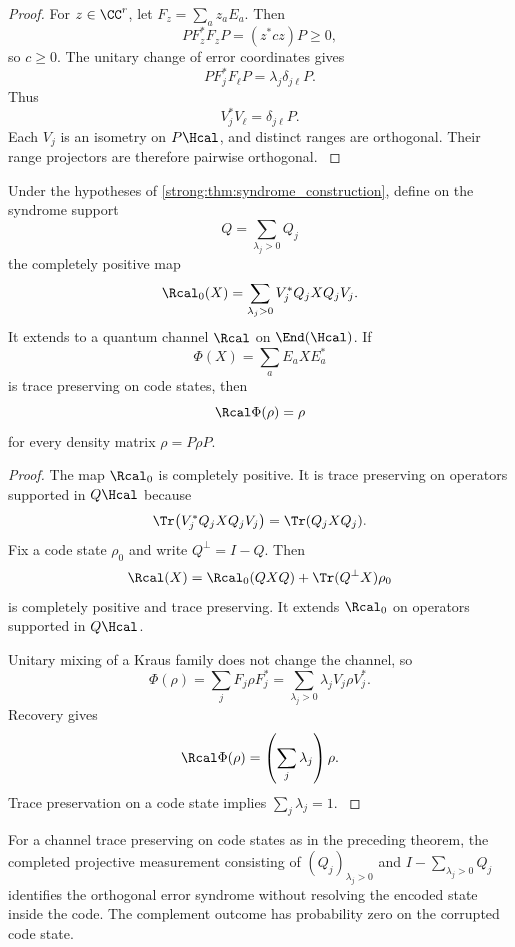 \begin{proof}\label{strong:proof:040}
For \(z\in\CC^r\), let \(F_z=\sum_az_aE_a\). Then
\[
PF_z^*F_zP=(z^*cz)P\geq0,
\]
so \(c\geq0\). The unitary change of error coordinates gives
\[
PF_j^*F_\ell P
=
\lambda_j\delta_{j\ell}P.
\]
Thus
\[
V_j^*V_\ell=\delta_{j\ell}P.
\]
Each \(V_j\) is an isometry on \(P\Hcal\), and distinct ranges are orthogonal. Their range projectors are therefore pairwise orthogonal.
\label{strong:proof:040:end}\end{proof}

\begin{theorem}\label{strong:theorem:028}\label{strong:thm:exact_recovery}
Under the hypotheses of \cref{strong:thm:syndrome_construction}, define on the syndrome support
\[
Q=\sum_{\lambda_j>0}Q_j
\]
the completely positive map
\[
\Rcal_0(X)
=
\sum_{\lambda_j>0}
V_j^*Q_jXQ_jV_j.
\]
It extends to a quantum channel \(\Rcal\) on \(\End(\Hcal)\). If
\[
\Phi(X)=\sum_aE_aXE_a^*
\]
is trace preserving on code states, then
\[
\Rcal\Phi(\rho)=\rho
\]
for every density matrix \(\rho=P\rho P\).
\end{theorem}

\begin{proof}\label{strong:proof:041}
The map \(\Rcal_0\) is completely positive. It is trace preserving on operators supported in \(Q\Hcal\) because
\[
\Tr\bigl(V_j^*Q_jXQ_jV_j\bigr)
=
\Tr(Q_jXQ_j).
\]
Fix a code state \(\rho_0\) and write \(Q^\perp=I-Q\). Then
\[
\Rcal(X)
=
\Rcal_0(QXQ)
+
\Tr(Q^\perp X)\rho_0
\]
is completely positive and trace preserving. It extends \(\Rcal_0\) on operators supported in \(Q\Hcal\).

Unitary mixing of a Kraus family does not change the channel, so
\[
\Phi(\rho)
=
\sum_jF_j\rho F_j^*
=
\sum_{\lambda_j>0}
\lambda_jV_j\rho V_j^*.
\]
Recovery gives
\[
\Rcal\Phi(\rho)
=
\left(\sum_j\lambda_j\right)\rho.
\]
Trace preservation on a code state implies \(\sum_j\lambda_j=1\).
\label{strong:proof:041:end}\end{proof}

\begin{corollary}\label{strong:corollary:011}\label{strong:cor:syndrome_preserves_logic}
For a channel trace preserving on code states as in the preceding theorem, the completed projective measurement consisting of \((Q_j)_{\lambda_j>0}\) and \(I-\sum_{\lambda_j>0}Q_j\) identifies the orthogonal error syndrome without resolving the encoded state inside the code. The complement outcome has probability zero on the corrupted code state.
\end{corollary}

